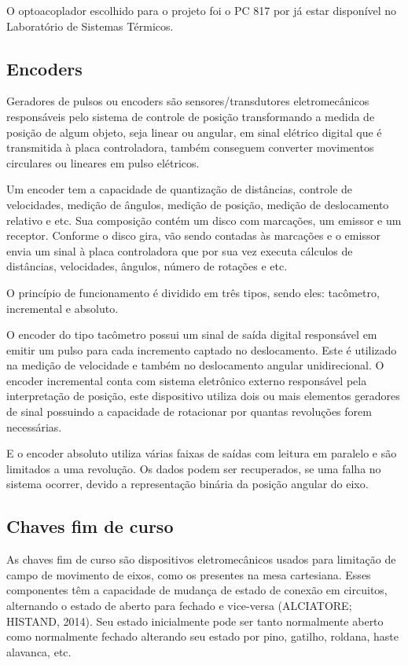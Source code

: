 O optoacoplador escolhido para o projeto foi o PC 817 por já estar disponível no Laboratório de Sistemas Térmicos.

\subsection{Encoders}

Geradores de pulsos ou encoders são sensores/transdutores eletromecânicos responsáveis pelo sistema de controle 
de posição transformando a medida de posição de algum objeto, seja linear ou angular, em sinal elétrico digital 
que é transmitida à placa controladora, também conseguem converter movimentos circulares ou lineares em pulso elétricos.

Um encoder tem a capacidade de quantização de distâncias, controle de velocidades, medição de ângulos, medição de posição,
medição de deslocamento relativo e etc. Sua composição contém um disco com marcações, um emissor e um receptor. 
Conforme o disco gira, vão sendo contadas às marcações e o emissor envia um sinal à placa controladora que por sua vez 
executa cálculos de distâncias, velocidades, ângulos, número de rotações e etc.

O princípio de funcionamento é dividido em três tipos, sendo eles: tacômetro, incremental e absoluto.

O encoder do tipo tacômetro possui um sinal de saída digital responsável em emitir um pulso para cada incremento 
captado no deslocamento. Este é utilizado na medição de velocidade e também no deslocamento angular unidirecional.
O encoder incremental conta com sistema eletrônico externo responsável pela interpretação de posição, este dispositivo 
utiliza dois ou mais elementos geradores de sinal possuindo a capacidade de rotacionar por quantas revoluções 
forem necessárias.

E o encoder absoluto utiliza várias faixas de saídas com leitura em paralelo e são limitados a uma revolução. 
Os dados podem ser recuperados, se uma falha no sistema ocorrer, devido a representação binária da posição 
angular do eixo.

\subsection{Chaves fim de curso}

As chaves fim de curso são dispositivos eletromecânicos usados para limitação de campo de movimento de eixos, 
como os presentes na mesa cartesiana. Esses componentes têm a capacidade de mudança de estado de conexão em circuitos, 
alternando o estado de aberto para fechado e vice-versa (ALCIATORE; HISTAND, 2014). Seu estado inicialmente pode 
ser tanto normalmente aberto como normalmente fechado alterando seu estado por pino, 
gatilho, roldana, haste alavanca, etc. 

